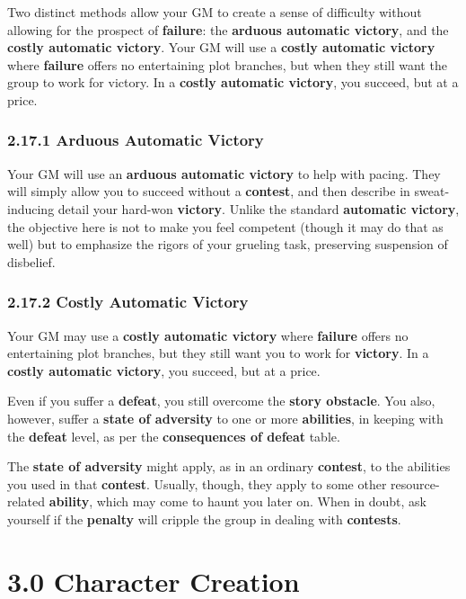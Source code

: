 \documentclass[
]{article}
\begin{document}
Two distinct methods allow your GM to create a sense of difficulty
without allowing for the prospect of \textbf{failure}: the
\textbf{arduous automatic victory}, and the \textbf{costly automatic
victory}. Your GM will use a \textbf{costly automatic victory} where
\textbf{failure} offers no entertaining plot branches, but when they
still want the group to work for victory. In a \textbf{costly automatic
victory}, you succeed, but at a price.

\hypertarget{arduous-automatic-victory}{%
\subsubsection{2.17.1 Arduous Automatic
Victory}\label{arduous-automatic-victory}}

Your GM will use an \textbf{arduous automatic victory} to help with
pacing. They will simply allow you to succeed without a
\textbf{contest}, and then describe in sweat-inducing detail your
hard-won \textbf{victory}. Unlike the standard \textbf{automatic
victory}, the objective here is not to make you feel competent (though
it may do that as well) but to emphasize the rigors of your grueling
task, preserving suspension of disbelief.

\hypertarget{costly-automatic-victory}{%
\subsubsection{2.17.2 Costly Automatic
Victory}\label{costly-automatic-victory}}

Your GM may use a \textbf{costly automatic victory} where
\textbf{failure} offers no entertaining plot branches, but they still
want you to work for \textbf{victory}. In a \textbf{costly automatic
victory}, you succeed, but at a price.

Even if you suffer a \textbf{defeat}, you still overcome the
\textbf{story obstacle}. You also, however, suffer a \textbf{state of
adversity} to one or more \textbf{abilities}, in keeping with the
\textbf{defeat} level, as per the \textbf{consequences of defeat} table.

The \textbf{state of adversity} might apply, as in an ordinary
\textbf{contest}, to the abilities you used in that \textbf{contest}.
Usually, though, they apply to some other resource-related
\textbf{ability}, which may come to haunt you later on. When in doubt,
ask yourself if the \textbf{penalty} will cripple the group in dealing
with \textbf{contests}.

\hypertarget{character-creation}{%
\section{3.0 Character Creation}\label{character-creation}}
\end{document}
